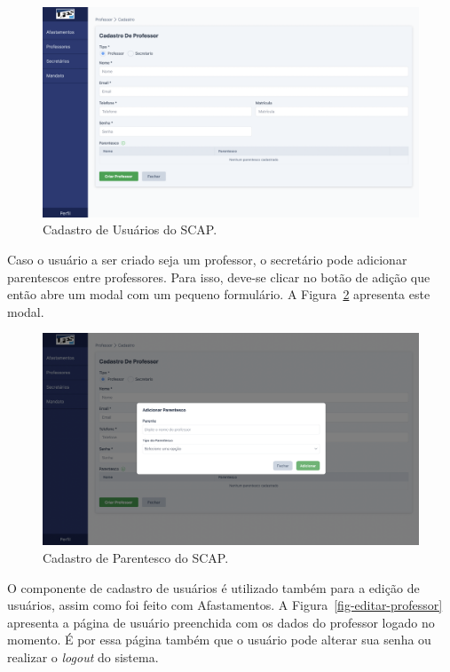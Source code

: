 \begin{figure}[h!]
    \centering
    \includegraphics[width=\textwidth]{figuras/prints-app/fig-cadastro-professor.png}
    \caption{Cadastro de Usuários do SCAP.}
    \label{fig-cadastro-professor}
\end{figure}


Caso o usuário a ser criado seja um professor, o secretário pode adicionar parentescos entre professores.
Para isso, deve-se clicar no botão de adição que então abre um modal com um pequeno formulário.
A Figura~\ref{fig-parentesco} apresenta este modal.


\begin{figure}
    \centering
    \includegraphics[width=\textwidth]{figuras/prints-app/fig-modal-parentesco.png}
    \caption{Cadastro de Parentesco do SCAP.}
    \label{fig-parentesco}
\end{figure}


O componente de cadastro de usuários é utilizado também para a edição de usuários, assim como foi feito com Afastamentos. A Figura~\ref{fig-editar-professor}
apresenta a página de usuário preenchida com os dados do professor logado no momento. É por essa página também que o usuário pode alterar sua senha ou realizar o \textit{logout} do sistema.

